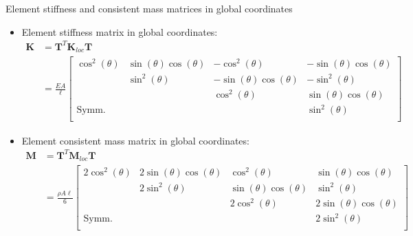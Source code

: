 \documentclass[aspectratio=169]{beamer}
\begin{document}
{
\color{white}
\begin{frame}{Element stiffness and consistent mass matrices in global coordinates}
  \begin{itemize}
    \item Element stiffness matrix in global coordinates:
          \begin{align*}
            \mathbf{K} & = \mathbf T^T \mathbf{K}_{loc} \mathbf T                                                                          \\
                       & =\frac{EA}{\ell}\begin{bmatrix}
                                           \cos^2(\theta) & \sin(\theta)\cos(\theta) & -\cos^2(\theta)           & -\sin(\theta)\cos(\theta) \\
                                                          & \sin^2(\theta)           & -\sin(\theta)\cos(\theta) & -\sin^2(\theta)           \\
                                                          &                          & \cos^2(\theta)            & \sin(\theta)\cos(\theta)  \\
                                           \text{Symm.}   &                          &                           & \sin^2(\theta)            \\
                                         \end{bmatrix}
          \end{align*}
    \item Element consistent mass matrix in global coordinates:
          \begin{align*}
            \mathbf{M} & = \mathbf T^T \mathbf{M}_{loc} \mathbf T                                                                                \\
                       & =\frac{\rho A\ell}{6}\begin{bmatrix}
                                                2\cos^2(\theta) & 2\sin(\theta)\cos(\theta) & \cos^2(\theta)           & \sin(\theta)\cos(\theta)  \\
                                                                & 2\sin^2(\theta)           & \sin(\theta)\cos(\theta) & \sin^2(\theta)            \\
                                                                &                           & 2\cos^2(\theta)          & 2\sin(\theta)\cos(\theta) \\
                                                \text{Symm.}    &                           &                          & 2\sin^2(\theta)           \\
                                              \end{bmatrix}
          \end{align*}
  \end{itemize}
\end{frame}

}
\end{document}
